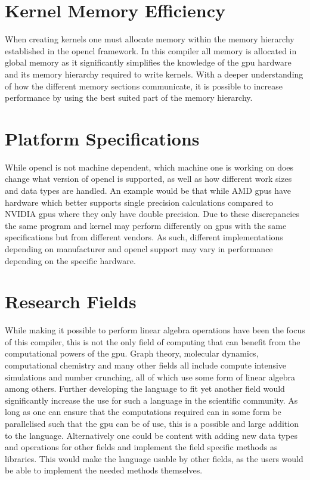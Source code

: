 \section{Kernel Memory Efficiency}
When creating kernels one must allocate memory within the memory hierarchy established in the \gls{opencl} framework. 
In this compiler all memory is allocated in global memory as it significantly simplifies the knowledge of the \acrshort{gpu} hardware and its memory hierarchy required to write kernels.
With a deeper understanding of how the different memory sections communicate, it is possible to increase performance by using the best suited part of the memory hierarchy. \citep{ocl_lecture3}

\section{Platform Specifications}
While \gls{opencl} is not machine dependent, which machine one is working on does change what version of \gls{opencl} is supported, as well as how different work sizes and data types are handled.
An example would be that while AMD \acrshort{gpu}s have hardware which better supports single precision calculations compared to NVIDIA \acrshort{gpu}s where they only have double precision. \citep{CUDAOpenCLOptimisation}
Due to these discrepancies the same program and kernel may perform differently on \acrshort{gpu}s with the same specifications but from different vendors.
As such, different implementations depending on manufacturer and \gls{opencl} support may vary in performance depending on the specific hardware.

\section{Research Fields}
While making it possible to perform linear algebra operations have been the focus of this compiler, this is not the only field of computing that can benefit from the computational powers of the \acrshort{gpu}.
Graph theory, molecular dynamics, computational chemistry and many other fields all include compute intensive simulations and number crunching, all of which use some form of linear algebra among others.
Further developing the language to fit yet another field would significantly increase the use for such a language in the scientific community.
As long as one can ensure that the computations required can in some form be parallelised such that the \acrshort{gpu} can be of use, this is a possible and large addition to the language.
Alternatively one could be content with adding new data types and operations for other fields and implement the field specific methods as libraries.
This would make the language usable by other fields, as the users would be able to implement the needed methods themselves.